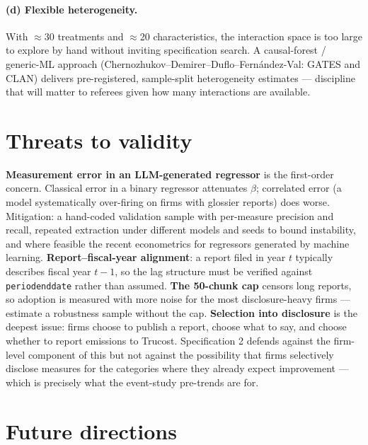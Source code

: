 \documentclass[11pt]{article}
\newcommand{\code}[1]{\texttt{\small #1}}
\begin{document}
\paragraph{(d) Flexible heterogeneity.} With $\approx$30 treatments and
$\approx$20 characteristics, the interaction space is too large to explore by
hand without inviting specification search. A causal-forest / generic-ML
approach (Chernozhukov--Demirer--Duflo--Fern\'andez-Val: GATES and CLAN)
delivers pre-registered, sample-split heterogeneity estimates --- discipline
that will matter to referees given how many interactions are available.

\section{Threats to validity}

\textbf{Measurement error in an LLM-generated regressor} is the first-order
concern. Classical error in a binary regressor attenuates $\beta$; correlated
error (a model systematically over-firing on firms with glossier reports) does
worse. Mitigation: a hand-coded validation sample with per-measure precision
and recall, repeated extraction under different models and seeds to bound
instability, and where feasible the recent econometrics for regressors
generated by machine learning. \textbf{Report--fiscal-year alignment}: a
report filed in year $t$ typically describes fiscal year $t-1$, so the lag
structure must be verified against \code{periodenddate} rather than assumed.
\textbf{The 50-chunk cap} censors long reports, so adoption is measured with
more noise for the most disclosure-heavy firms --- estimate a robustness
sample without the cap. \textbf{Selection into disclosure} is the deepest
issue: firms choose to publish a report, choose what to say, and choose
whether to report emissions to Trucost. Specification 2 defends against the
firm-level component of this but not against the possibility that firms
selectively disclose measures for the categories where they already expect
improvement --- which is precisely what the event-study pre-trends are for.

\section{Future directions}
\end{document}

